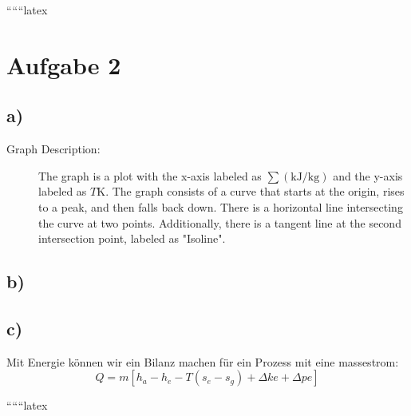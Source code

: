 
``````latex


\section*{Aufgabe 2}

\subsection*{a)}

\begin{description}
    \item[Graph Description:] The graph is a plot with the x-axis labeled as $\sum (\text{kJ}/\text{kg})$ and the y-axis labeled as $T\text{K}$. The graph consists of a curve that starts at the origin, rises to a peak, and then falls back down. There is a horizontal line intersecting the curve at two points. Additionally, there is a tangent line at the second intersection point, labeled as "Isoline".
\end{description}

\subsection*{b)}

\subsection*{c)}
Mit Energie können wir ein Bilanz machen für ein Prozess mit eine massestrom:
\[
Q = m \left[ h_a - h_e - T \left( s_e - s_g \right) + \Delta k e + \Delta p e \right]
\]

``````latex



